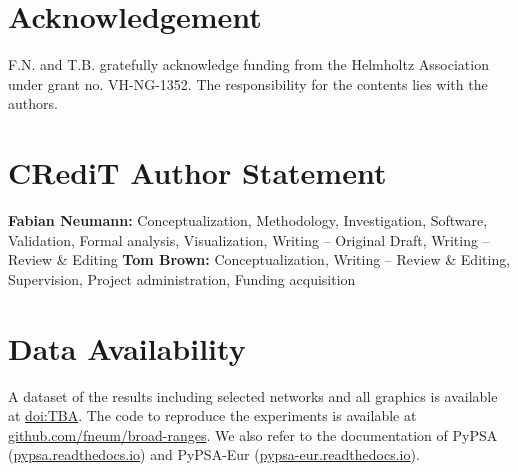 \documentclass[1p,11pt]{elsarticle}
\begin{document}


\section*{Acknowledgement}

F.N. and T.B. gratefully acknowledge funding from the Helmholtz
Association under grant no. VH-NG-1352.
The responsibility for the contents lies with the authors.

\section*{CRediT Author Statement}

\textbf{Fabian Neumann:} Conceptualization, Methodology, Investigation, Software, Validation, Formal analysis, Visualization, Writing -- Original Draft, Writing -- Review \& Editing
\textbf{Tom Brown:} Conceptualization, Writing -- Review \& Editing, Supervision, Project administration, Funding acquisition

\section*{Data Availability}

A dataset of the results including selected networks and all graphics is available at \href{TBA}{doi:TBA}.
The code to reproduce the experiments is available at \href{https://github.com/fneum/broad-ranges}{github.com/fneum/broad-ranges}.
We also refer to the documentation of PyPSA (\href{https://pypsa.readthedocs.io}{pypsa.readthedocs.io}) and
PyPSA-Eur (\href{https://pypsa-eur.readthedocs.io}{pypsa-eur.readthedocs.io}).

\renewcommand{\ttdefault}{\sfdefault}


\newpage
\tableofcontents

% 	
\end{document}
